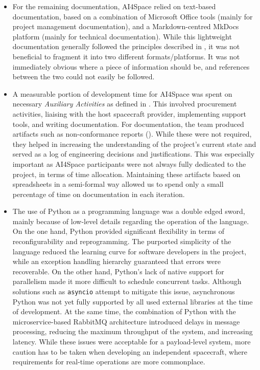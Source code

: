 \documentclass[a4paper,nobib,justified,final]{tufte-book}
\begin{document}
\begin{itemize}[itemsep=-1ex]
\item For the remaining documentation, AI4Space relied on text-based documentation, based on a combination of Microsoft Office tools (mainly for project management documentation), and a Markdown-centred MkDocs platform (mainly for technical documentation). While this lightweight documentation generally followed the principles described in , it was not beneficial to fragment it into two different formats/platforms. It was not immediately obvious where a piece of information should be, and references between the two could not easily be followed.

\item A measurable portion of development time for AI4Space was spent on necessary \emph{Auxiliary Activities} as defined in . This involved procurement activities, liaising with the host spacecraft provider, implementing support tools, and writing documentation.
For documentation, the team produced artifacts such as non-conformance reports (). While these were not required, they helped in increasing the understanding of the project's current state and served as a log of engineering decisions and justifications. This was especially important as AI4Space participants were not always fully dedicated to the project, in terms of time allocation. Maintaining these artifacts based on spreadsheets in a semi-formal way allowed us to spend only a small percentage of time on documentation in each iteration.

\item The use of Python as a programming language was a double edged sword, mainly because of low-level details regarding the operation of the language. On the one hand, Python provided significant flexibility in terms of reconfigurability and reprogramming. The purported simplicity of the language reduced the learning curve for software developers in the project, while an exception handling hierarchy guaranteed that errors were recoverable. On the other hand, Python's lack of native support for parallelism made it more difficult to schedule concurrent tasks. Although solutions such as \texttt{asyncio} attempt to mitigate this issue, asynchronous Python was not yet fully supported by all used external libraries at the time of development. At the same time, the combination of Python with the microservice-based RabbitMQ architecture introduced delays in message processing, reducing the maximum throughput of the system, and increasing latency. While these issues were acceptable for a payload-level system, more caution has to be taken when developing an independent spacecraft, where requirements for real-time operations are more commonplace.


\end{itemize}
\end{document}
